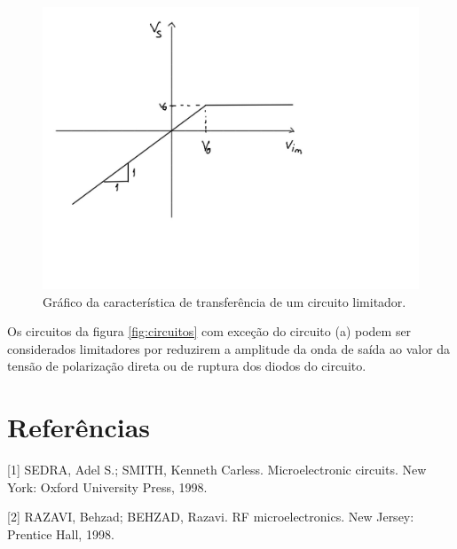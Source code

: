\documentclass{abntex2}
\begin{document}
\begin{figure}[h]
  \centering
  \includegraphics[scale = 0.75]{grafLimitador.jpg}
  \caption{Gráfico da característica de transferência de um circuito limitador.}
  \label{fig:limitador}
\end{figure}

Os circuitos da figura \ref{fig:circuitos} com exceção do circuito (a) podem ser considerados limitadores por reduzirem a amplitude da onda de saída ao valor da tensão de polarização direta ou de ruptura dos diodos do circuito.

\section*{Referências}


[1] SEDRA, Adel S.; SMITH, Kenneth Carless. Microelectronic circuits. New York: Oxford University Press, 1998.

[2] RAZAVI, Behzad; BEHZAD, Razavi. RF microelectronics. New Jersey: Prentice Hall, 1998.
\end{document}
